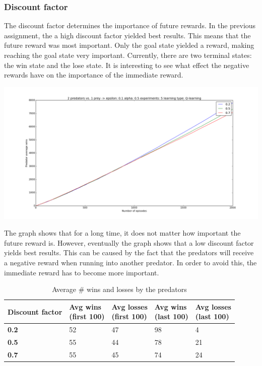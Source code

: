 \subsubsection{Discount factor}
The discount factor determines the importance of future rewards. In the previous assignment, the a high discount factor yielded best results. This means that the future reward was most important. Only the goal state yielded a reward, making reaching the goal state very important. Currently, there are two terminal states: the win state and the lose state. It is interesting to see what effect the negative rewards have on the importance of the immediate reward.

\begin{center}
	\includegraphics[scale=0.3]{2_predators_discount_factor_q_learning}
\end{center}

The graph shows that for a long time, it does not matter how important the future reward is. However, eventually the graph shows that a low discount factor yields best results. This can be caused by the fact that the predators will receive a negative reward when running into another predator. In order to avoid this, the immediate reward has to become more important.

\begin{table}[H]
\begin{center}
\begin{tabular}{| l | l | l | l | l |}
\hline
\parbox{2cm}{\textbf{Discount factor}} & \parbox{2cm}{\textbf{Avg wins \\ (first 100)}} & \parbox{2cm}{\textbf{Avg losses \\ (first 100)}} & \parbox{2cm}{\textbf{Avg wins \\ (last 100)}} & \parbox{2cm}{\textbf{Avg losses \\ (last 100)}} \\
\hline
\textbf{0.2} & 52 & 47 & 98 & 4 \\
\hline
\textbf{0.5} & 55 & 44 & 78 & 21 \\
\hline
\textbf{0.7} & 55 & 45 & 74 & 24 \\
\hline
\end{tabular}
\caption{Average \# wins and losses by the predators}
\end{center}
\end{table}

